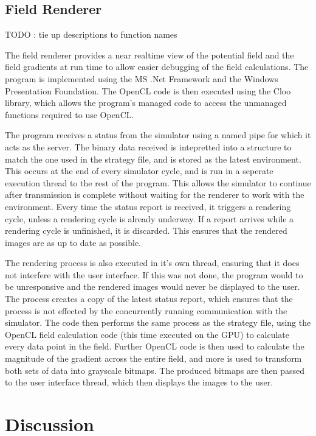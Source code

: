 \documentclass[10pt]{article}
\begin{document}
\subsection{Field Renderer}

TODO : tie up descriptions to function names

The field renderer provides a near realtime view of the potential field and the field gradients at run time to allow easier debugging of the field calculations. The program is implemented using the MS .Net Framework and the Windows Presentation Foundation. The OpenCL code is then executed using the Cloo library, which allows the program's managed code to access the unmanaged functions required to use OpenCL.

The program receives a status from the simulator using a named pipe for which it acts as the server. The binary data received is intepretted into a structure to match the one used in the strategy file, and is stored as the latest environment. This occurs at the end of every simulator cycle, and is run in a seperate execution thread to the rest of the program. This allows the simulator to continue after transmission is complete without waiting for the renderer to work with the environment. Every time the status report is received, it triggers a rendering cycle, unless a rendering cycle is already underway. If a report arrives while a rendering cycle is unfinished, it is discarded. This ensures that the rendered images are as up to date as possible.

The rendering process is also executed in it's own thread, ensuring that it does not interfere with the user interface. If this was not done, the program would to be unresponsive and the rendered images would never be displayed to the user. The process creates a copy of the latest status report, which ensures that the process is not effected by the concurrently running communication with the simulator. The code then performs the same process as the strategy file, using the OpenCL field calculation code (this time executed on the \ac{GPU}) to calculate every data point in the field. Further OpenCL code is then used to calculate the magnitude of the gradient across the entire field, and more is used to transform both sets of data into grayscale bitmaps. The produced bitmaps are then passed to the user interface thread, which then displays the images to the user.

\section{Discussion}
\end{document}
